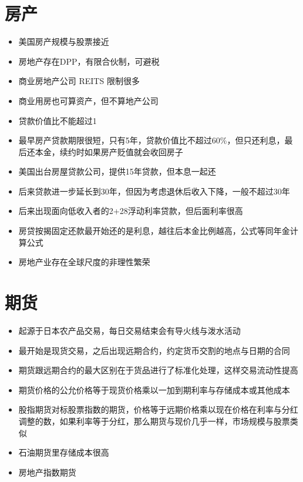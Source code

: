 \documentclass[
]{book}
\providecommand{\tightlist}{%
  \setlength{\itemsep}{0pt}\setlength{\parskip}{0pt}}
\begin{document}
\hypertarget{ux623fux4ea7}{%
\section{房产}\label{ux623fux4ea7}}

\begin{itemize}
\tightlist
\item
  美国房产规模与股票接近
\item
  房地产存在DPP，有限合伙制，可避税
\item
  商业房地产公司 REITS 限制很多
\item
  商业用房也可算资产，但不算地产公司
\item
  贷款价值比不能超过1
\item
  最早房产贷款期限很短，只有5年，贷款价值比不超过60\%，但只还利息，最后还本金，续约时如果房产贬值就会收回房子
\item
  美国出台房屋贷款公司，提供15年贷款，但本息一起还
\item
  后来贷款进一步延长到30年，但因为考虑退休后收入下降，一般不超过30年
\item
  后来出现面向低收入者的2+28浮动利率贷款，但后面利率很高
\item
  房贷按揭固定还款最开始还的是利息，越往后本金比例越高，公式等同年金计算公式
\item
  房地产业存在全球尺度的非理性繁荣
\end{itemize}

\hypertarget{ux671fux8d27}{%
\section{期货}\label{ux671fux8d27}}

\begin{itemize}
\tightlist
\item
  起源于日本农产品交易，每日交易结束会有导火线与泼水活动
\item
  最开始是现货交易，之后出现远期合约，约定货币交割的地点与日期的合同
\item
  期货跟远期合约的最大区别在于货品进行了标准化处理，这样交易流动性提高
\item
  期货价格的公允价格等于现货价格乘以一加到期利率与存储成本或其他成本
\item
  股指期货对标股票指数的期货，价格等于远期价格乘以现在价格在利率与分红调整的数，如果利率等于分红，那么期货与现价几乎一样，市场规模与股票类似
\item
  石油期货里存储成本很高
\item
  房地产指数期货
\end{itemize}
\end{document}
